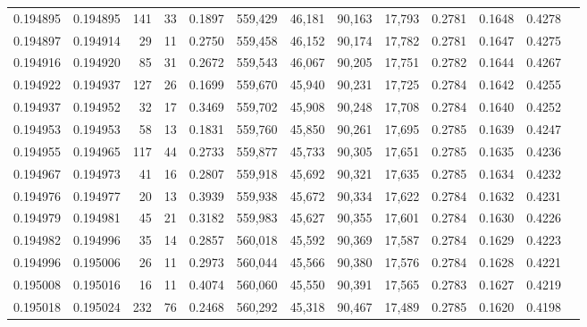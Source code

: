 \begin{tabular}{rrrrrrrrrrrrr}
0.194895 & 0.194895 &   141 &  33 &                                     0.1897 & 559,429 &  46,181 &  90,163 &  17,793 & 0.2781 & 0.1648 & 0.4278 \\
0.194897 & 0.194914 &    29 &  11 &                                     0.2750 & 559,458 &  46,152 &  90,174 &  17,782 & 0.2781 & 0.1647 & 0.4275 \\
0.194916 & 0.194920 &    85 &  31 &                                     0.2672 & 559,543 &  46,067 &  90,205 &  17,751 & 0.2782 & 0.1644 & 0.4267 \\
0.194922 & 0.194937 &   127 &  26 &                                     0.1699 & 559,670 &  45,940 &  90,231 &  17,725 & 0.2784 & 0.1642 & 0.4255 \\
0.194937 & 0.194952 &    32 &  17 &                                     0.3469 & 559,702 &  45,908 &  90,248 &  17,708 & 0.2784 & 0.1640 & 0.4252 \\
0.194953 & 0.194953 &    58 &  13 &                                     0.1831 & 559,760 &  45,850 &  90,261 &  17,695 & 0.2785 & 0.1639 & 0.4247 \\
0.194955 & 0.194965 &   117 &  44 &                                     0.2733 & 559,877 &  45,733 &  90,305 &  17,651 & 0.2785 & 0.1635 & 0.4236 \\
0.194967 & 0.194973 &    41 &  16 &                                     0.2807 & 559,918 &  45,692 &  90,321 &  17,635 & 0.2785 & 0.1634 & 0.4232 \\
0.194976 & 0.194977 &    20 &  13 &                                     0.3939 & 559,938 &  45,672 &  90,334 &  17,622 & 0.2784 & 0.1632 & 0.4231 \\
0.194979 & 0.194981 &    45 &  21 &                                     0.3182 & 559,983 &  45,627 &  90,355 &  17,601 & 0.2784 & 0.1630 & 0.4226 \\
0.194982 & 0.194996 &    35 &  14 &                                     0.2857 & 560,018 &  45,592 &  90,369 &  17,587 & 0.2784 & 0.1629 & 0.4223 \\
0.194996 & 0.195006 &    26 &  11 &                                     0.2973 & 560,044 &  45,566 &  90,380 &  17,576 & 0.2784 & 0.1628 & 0.4221 \\
0.195008 & 0.195016 &    16 &  11 &                                     0.4074 & 560,060 &  45,550 &  90,391 &  17,565 & 0.2783 & 0.1627 & 0.4219 \\
0.195018 & 0.195024 &   232 &  76 &                                     0.2468 & 560,292 &  45,318 &  90,467 &  17,489 & 0.2785 & 0.1620 & 0.4198 \\

\end{tabular}
